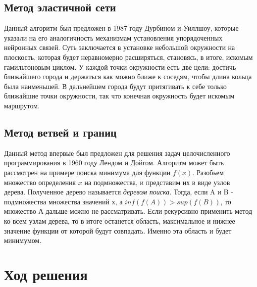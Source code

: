 \documentclass[a4paper, 12pt] {article}
\begin{document}
\subsection{Метод эластичной сети}
Данный алгоритм был предложен в 1987 году Дурбином и Уиллшоу, которые указали на его аналогичность механизмам установления упорядоченных нейронных связей. Суть заключается в установке небольшой окружности на плоскость, которая будет неравномерно расширяться, становясь, в итоге, искомым гамильтоновым циклом. У каждой точки окружности есть две цели: достичь ближайшего города и держаться как можно ближе к соседям, чтобы длина кольца была наименьшей. В дальнейшем города будут притягивать к себе только ближайшие точки окружности, так что конечная окружность будет искомым маршрутом.

\subsection{Метод ветвей и границ}
Данный метод впервые был предложен для решения задач целочисленного программирования в 1960 году Лендом и Дойгом. Алгоритм может быть рассмотрен на примере поиска минимума для функции $f(x)$. Разобьем множество определения $x$ на подмножества, и представим их в виде узлов дерева. Полученное дерево называется \textit{деревом поиска}. Тогда, если A и B - подмножества множества значений х, а $inf(f(A)) > sup(f(B))$, то множество А дальше можно не рассматривать. Если рекурсивно применить метод ко всем узлам дерева, то в итоге останется область, максимальное и нижнее  значение функции от которой будут совпадать. Именно эта область и будет минимумом.

\section{Ход решения}
\end{document}
